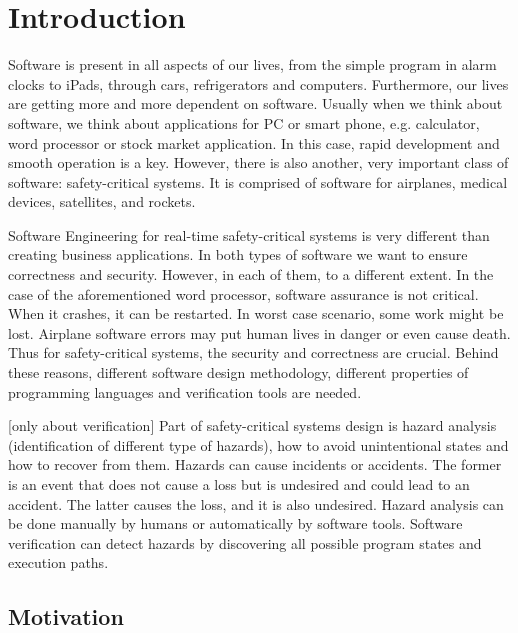 
\cleardoublepage

\chapter{Introduction}
\label{introduction}

Software is present in all aspects of our lives, from the simple program in alarm clocks to iPads, through cars, refrigerators and computers. Furthermore, our lives are getting more and more dependent on software. Usually when we think about software, we think about applications for PC or smart phone, e.g. calculator, word processor or stock market application. In this case, rapid development and smooth operation is a key. However, there is also another, very important class of software: safety-critical systems. It is comprised of software for airplanes, medical devices, satellites, and rockets.

Software Engineering for real-time safety-critical systems is very different than creating business applications. In both types of software we want to ensure correctness and security. However, in each of them, to a different extent. In the case of the aforementioned word processor, software assurance is not critical. When it crashes, it can be restarted. In worst case scenario, some work might be lost. Airplane software errors may put human lives in danger or even cause death. Thus for safety-critical systems, the security and correctness are crucial. Behind these reasons, different software design methodology, different properties of programming languages and verification tools are needed.

[only about verification]
Part of safety-critical systems design is hazard analysis (identification of different type of hazards), how to avoid unintentional states and how to recover from them. Hazards can cause incidents or accidents. The former is an event that does not cause a loss but is undesired and could lead to an accident. The latter causes the loss, and it is also undesired. Hazard analysis can be done manually by humans or automatically by software tools. Software verification can detect hazards by discovering all possible program states and execution paths.


\section{Motivation}
\label{introduction:motivation}


